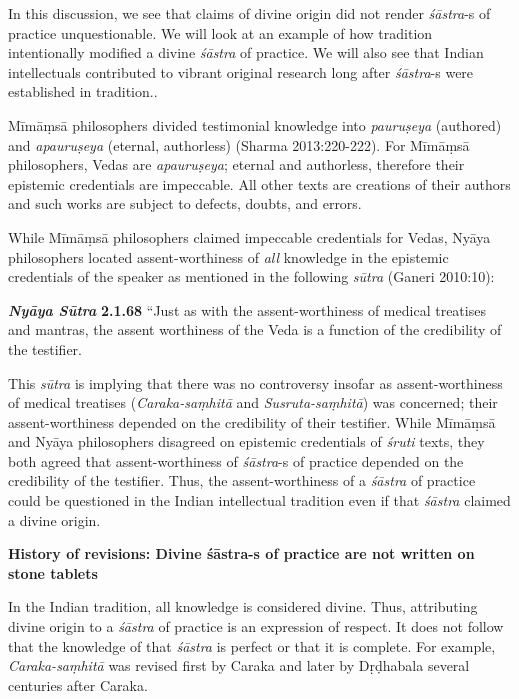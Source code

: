 In this discussion, we see that claims of divine origin did not render {\sl śāstra}-s of practice unquestionable. We will look at an example of how tradition intentionally modified a divine {\sl śāstra} of practice. We will also see that Indian intellectuals contributed to vibrant original research long after {\sl śāstra}-s were established in tradition..

\newpage

Mīmāṃsā philosophers divided testimonial knowledge into {\sl pauruṣeya} (authored) and {\sl apauruṣeya} (eternal, authorless) (Sharma 2013:220-222). For Mīmāṃsā philosophers, Vedas are {\sl apauruṣeya}; eternal and authorless, therefore their epistemic credentials are impeccable. All other texts are creations of their authors and such works are subject to defects, doubts, and errors.

While Mīmāṃsā philosophers claimed impeccable credentials for Vedas, Nyāya philosophers located assent-worthiness of {\sl all} knowledge in the epistemic credentials of the speaker as mentioned in the following {\sl sūtra} (Ganeri 2010:10):
\begin{myquote}
{{\sl\bfseries Nyāya Sūtra}\relax}  {\bf 2.1.68} ``Just as with the assent-worthiness of medical treatises and mantras, the assent worthiness of the Veda is a function of the credibility of the testifier.
\end{myquote}

This {\sl sūtra} is implying that there was no controversy insofar as assent-worthiness of medical treatises ({\sl Caraka-saṃhitā} and {\sl Susruta-saṃhitā}) was concerned; their assent-worthiness depended on the credibility of their testifier. While Mīmāṃsā and Nyāya philosophers disagreed on epistemic credentials of {\sl śruti} texts, they both agreed that assent-worthiness of {\sl śāstra}-s of practice depended on the credibility of the testifier. Thus, the assent-worthiness of a {\sl śāstra} of practice could be questioned in the Indian intellectual tradition even if that {\sl śāstra} claimed a divine origin.

{\bf History of revisions: Divine śāstra-s of practice are not written on stone tablets}

In the Indian tradition, all knowledge is considered divine.  Thus, attributing divine origin to a {\sl śāstra} of practice is an expression of respect.  It does not follow that the knowledge of that {\sl śāstra} is perfect or that it is complete.  For example, {\sl Caraka-saṃhitā} was revised first by Caraka and later by Dṛḍhabala several centuries after Caraka.

